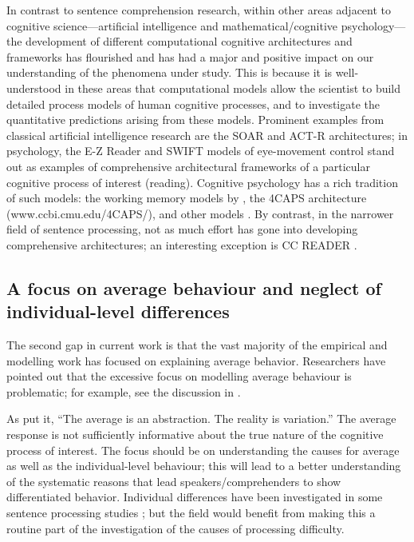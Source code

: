 \documentclass{cambridge7A}\usepackage[]{graphicx}\usepackage[]{color}
\begin{document}
In contrast to sentence comprehension research, within other areas 
adjacent to cognitive science---artificial intelligence and 
mathematical/cognitive psychology---the development of different
computational cognitive architectures and frameworks has flourished
and has had a major and positive impact on our understanding of the
phenomena under study.  This is because it is well-understood in these
areas that computational models allow the scientist to build detailed
process models of human cognitive processes, and to investigate the
quantitative predictions arising from these models. Prominent examples
from classical artificial intelligence  research are the SOAR \citep{laird2012soar} and  
ACT-R \citep{AndersonEtAl2004} architectures; in psychology, the E-Z 
Reader \citep{Reichle2003,ReichleWarrenMcConnell2009} 
and SWIFT \citep{EngbertNuthmannRichter2005,richteretal06,Rabe2019} 
models of eye-movement control stand out as examples of 
comprehensive architectural frameworks of a particular cognitive
process of interest (reading).  Cognitive psychology has a rich 
tradition of such models: the working memory models by
\cite{OberauerKliegl2006,LewandowskyGeigerOberauer2008}, the  4CAPS architecture \citep{justetal99,just2007organization,varma2016caps} (www.ccbi.cmu.edu/4CAPS/), and other models \citep{lee2014bayesian,busemeyer2010cognitive,lewiscogmodsym,farrell2018computational}.
By contrast, in the narrower field of sentence processing, not as much effort has gone into developing comprehensive architectures; an interesting exception is CC READER \citep{JustCarpenter1992,just2002haw}.

\subsection{A focus on average behaviour and neglect of individual-level differences}

The second gap in current work is that the vast majority of the empirical and modelling work has focused on explaining average behavior.  Researchers have pointed out that the excessive focus on modelling average behaviour is problematic; for example, see the discussion in \cite{kidd2018individual}.

As \cite{norm} put it, ``The average is an abstraction. The reality is
variation.'' The average response is not sufficiently informative
about the true nature of the cognitive process of interest. The focus
should be on understanding the causes for average as well as the 
individual-level behaviour; this will lead to a better understanding
of the systematic reasons that lead speakers/comprehenders to show
differentiated behavior.  Individual differences have been
investigated in some sentence processing studies
\citep[e.g.,][]{JustCarpenter1992,van2014low,MacDonaldChristiansen2002}; but the
field would benefit from making this a routine part of the
investigation of the causes of processing difficulty.
\end{document}
